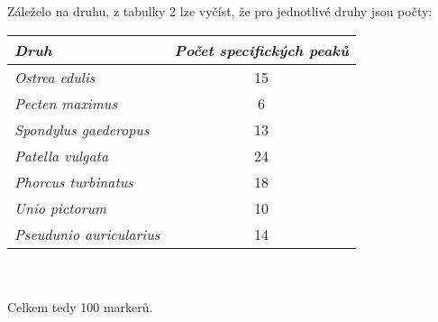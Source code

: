 \documentclass{article}
\begin{document}
\begin{enumerate}
    Záleželo na druhu, z tabulky 2 lze vyčíst, že pro jednotlivé druhy jsou počty:
    \begin{table}[h!]
        \centering
        \begin{tabular}{|l|c|}
        \hline
        \textit{Druh} & \textit{Počet specifických peaků} \\ \hline
        \textit{Ostrea edulis} & 15 \\ \hline
        \textit{Pecten maximus} & 6 \\ \hline
        \textit{Spondylus gaederopus} & 13 \\ \hline
        \textit{Patella vulgata} & 24 \\ \hline
        \textit{Phorcus turbinatus} & 18 \\ \hline
        \textit{Unio pictorum} & 10 \\ \hline
        \textit{Pseudunio auricularius} & 14 \\ \hline
        \end{tabular}
    \end{table}
    \\
    \\
    Celkem tedy 100 markerů.

\end{enumerate}
\end{document}
